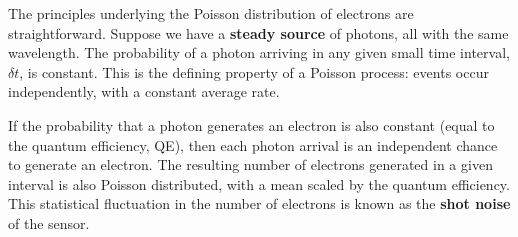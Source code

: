 \documentclass[
  letterpaper,
]{book}
\begin{document}
The principles underlying the Poisson distribution of electrons are
straightforward. Suppose we have a \textbf{steady source} of photons,
all with the same wavelength. The probability of a photon arriving in
any given small time interval, \(\delta t\), is constant. This is the
defining property of a Poisson process: events occur independently, with
a constant average rate.

If the probability that a photon generates an electron is also constant
(equal to the quantum efficiency, QE), then each photon arrival is an
independent chance to generate an electron. The resulting number of
electrons generated in a given interval is also Poisson distributed,
with a mean scaled by the quantum efficiency. This statistical
fluctuation in the number of electrons is known as the \textbf{shot
noise} of the sensor.
\end{document}
